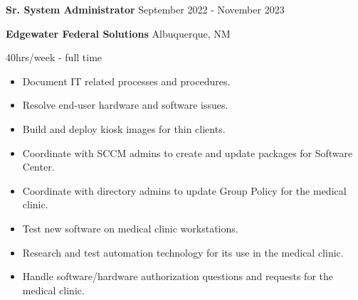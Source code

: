 \documentclass[../main.tex]{subfiles}
\begin{document}
    \textbf{Sr. System Administrator}
    \hfill
    September 2022 - November 2023
    
    \textbf{Edgewater Federal Solutions}
    \hfill
    Albuquerque, NM
    
    \hfill
    40hrs/week - full time
    \begin{itemize}
        \item Document IT related processes and procedures.
        \item Resolve end-user hardware and software issues.
        \item Build and deploy kiosk images for thin clients.
        \item Coordinate with SCCM admins to create and update packages for Software Center.
        \item Coordinate with directory admins to update Group Policy for the medical clinic.
        \item Test new software on medical clinic workstations.
        \item Research and test automation technology for its use in the medical clinic.
        \item Handle software/hardware authorization questions and requests for the medical clinic.
    \end{itemize}
\end{document}
